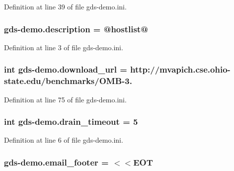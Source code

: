 Definition at line 39 of file gds-\/demo.\-ini.

\hypertarget{namespacegds-demo_a8ce383223449cab9f79575209d7dff2a}{
\subsubsection[{description}]{\setlength{\rightskip}{0pt plus 5cm}gds-\/demo.\-description = @{\bf hostlist}@}}\label{namespacegds-demo_a8ce383223449cab9f79575209d7dff2a}


Definition at line 3 of file gds-\/demo.\-ini.

\hypertarget{namespacegds-demo_a36280178b5a910db19b6220529c58159}{
\subsubsection[{download\-\_\-url}]{\setlength{\rightskip}{0pt plus 5cm}int gds-\/demo.\-download\-\_\-url = http\-://mvapich.\-cse.\-ohio-\/state.\-edu/benchmarks/O\-M\-B-\/3.}}\label{namespacegds-demo_a36280178b5a910db19b6220529c58159}


Definition at line 75 of file gds-\/demo.\-ini.

\hypertarget{namespacegds-demo_a87264971a99b7a376dc48ab3d1cd7469}{
\subsubsection[{drain\-\_\-timeout}]{\setlength{\rightskip}{0pt plus 5cm}int gds-\/demo.\-drain\-\_\-timeout = 5}}\label{namespacegds-demo_a87264971a99b7a376dc48ab3d1cd7469}


Definition at line 6 of file gds-\/demo.\-ini.

\hypertarget{namespacegds-demo_a131b88d6f8596699cad6b6501edee00e}{
\subsubsection[{email\-\_\-footer}]{\setlength{\rightskip}{0pt plus 5cm}gds-\/demo.\-email\-\_\-footer = $<$$<$E\-O\-T}}\label{namespacegds-demo_a131b88d6f8596699cad6b6501edee00e}


